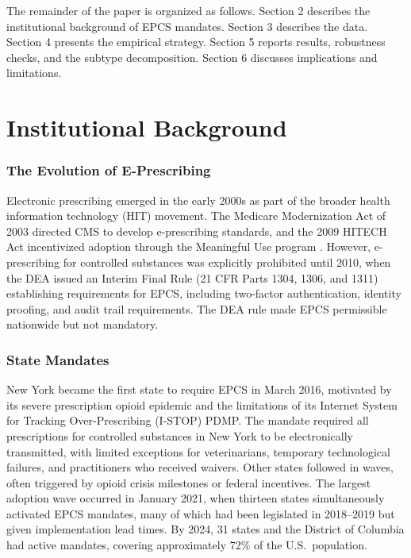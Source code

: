 \documentclass[12pt]{article}
\begin{document}
The remainder of the paper is organized as follows. Section 2 describes the institutional background of EPCS mandates. Section 3 describes the data. Section 4 presents the empirical strategy. Section 5 reports results, robustness checks, and the subtype decomposition. Section 6 discusses implications and limitations.

\section{Institutional Background}

\subsubsection*{The Evolution of E-Prescribing} Electronic prescribing emerged in the early 2000s as part of the broader health information technology (HIT) movement. The Medicare Modernization Act of 2003 directed CMS to develop e-prescribing standards, and the 2009 HITECH Act incentivized adoption through the Meaningful Use program \citep{desroches2015}. However, e-prescribing for controlled substances was explicitly prohibited until 2010, when the DEA issued an Interim Final Rule (21 CFR Parts 1304, 1306, and 1311) establishing requirements for EPCS, including two-factor authentication, identity proofing, and audit trail requirements. The DEA rule made EPCS permissible nationwide but not mandatory.

\subsubsection*{State Mandates} New York became the first state to require EPCS in March 2016, motivated by its severe prescription opioid epidemic and the limitations of its Internet System for Tracking Over-Prescribing (I-STOP) PDMP. The mandate required all prescriptions for controlled substances in New York to be electronically transmitted, with limited exceptions for veterinarians, temporary technological failures, and practitioners who received waivers. Other states followed in waves, often triggered by opioid crisis milestones or federal incentives. The largest adoption wave occurred in January 2021, when thirteen states simultaneously activated EPCS mandates, many of which had been legislated in 2018--2019 but given implementation lead times. By 2024, 31 states and the District of Columbia had active mandates, covering approximately 72\% of the U.S.\ population.
\end{document}
